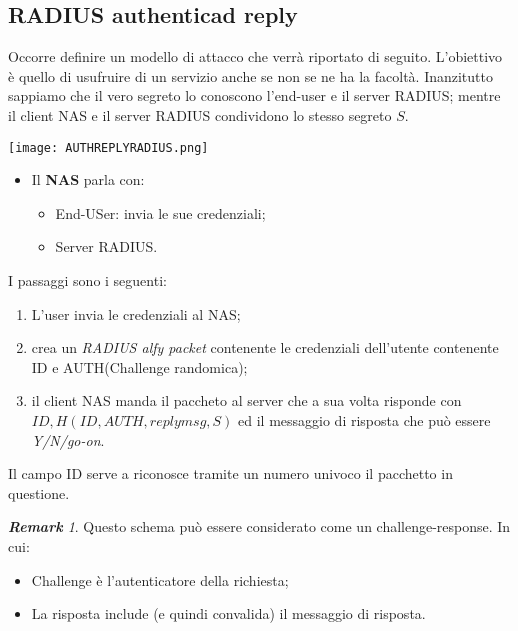 \documentclass{article}
\theoremstyle{remark}
\newtheorem*{remark}{\textbf{Remark}}
\begin{document}
\subsection{RADIUS authenticad reply}
Occorre definire un modello di attacco che verrà riportato di seguito. L'obiettivo è quello di usufruire di un servizio anche se non se ne ha la facoltà. Inanzitutto sappiamo che il vero segreto lo conoscono l'end-user e il server RADIUS; mentre il client NAS e il server RADIUS condividono lo stesso segreto $S$.
\begin{center}
	\texttt{[image: AUTHREPLYRADIUS.png]}
\end{center}
\begin{itemize}
	\item Il \textbf{NAS} parla con:\begin{itemize}
		      \item End-USer: invia le sue credenziali;
		      \item Server RADIUS.
	      \end{itemize}
\end{itemize}
I passaggi sono i seguenti:
\begin{enumerate}
	\item  L'user invia le credenziali al NAS;
	\item crea un \emph{RADIUS alfy packet} contenente le credenziali dell'utente contenente ID e AUTH(Challenge randomica);
	\item il client NAS manda il paccheto al server che a sua volta risponde con \emph{$ID,H(ID,AUTH,replymsg,S)$} ed il messaggio di risposta che può essere \emph{Y/N/go-on}.
\end{enumerate}
Il campo ID serve a riconosce tramite un numero univoco il pacchetto in questione.
\begin{remark}
	Questo schema può essere considerato come un challenge-response. In cui:\begin{itemize}
		\item Challenge è l'autenticatore della richiesta;
		\item La risposta include (e quindi convalida) il messaggio di risposta.
	\end{itemize}
\end{remark}
\end{document}
